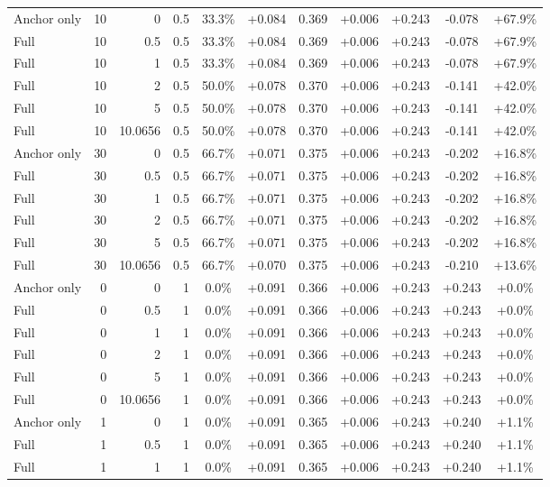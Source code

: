 \begin{table}[htbp]
\begin{tabular}{lrrrccccccc}
Anchor only & 10 & 0 & 0.5 & 33.3\% & +0.084 & 0.369 & +0.006 & +0.243 & -0.078 & +67.9\% \\
Full & 10 & 0.5 & 0.5 & 33.3\% & +0.084 & 0.369 & +0.006 & +0.243 & -0.078 & +67.9\% \\
Full & 10 & 1 & 0.5 & 33.3\% & +0.084 & 0.369 & +0.006 & +0.243 & -0.078 & +67.9\% \\
Full & 10 & 2 & 0.5 & 50.0\% & +0.078 & 0.370 & +0.006 & +0.243 & -0.141 & +42.0\% \\
Full & 10 & 5 & 0.5 & 50.0\% & +0.078 & 0.370 & +0.006 & +0.243 & -0.141 & +42.0\% \\
Full & 10 & 10.0656 & 0.5 & 50.0\% & +0.078 & 0.370 & +0.006 & +0.243 & -0.141 & +42.0\% \\
Anchor only & 30 & 0 & 0.5 & 66.7\% & +0.071 & 0.375 & +0.006 & +0.243 & -0.202 & +16.8\% \\
Full & 30 & 0.5 & 0.5 & 66.7\% & +0.071 & 0.375 & +0.006 & +0.243 & -0.202 & +16.8\% \\
Full & 30 & 1 & 0.5 & 66.7\% & +0.071 & 0.375 & +0.006 & +0.243 & -0.202 & +16.8\% \\
Full & 30 & 2 & 0.5 & 66.7\% & +0.071 & 0.375 & +0.006 & +0.243 & -0.202 & +16.8\% \\
Full & 30 & 5 & 0.5 & 66.7\% & +0.071 & 0.375 & +0.006 & +0.243 & -0.202 & +16.8\% \\
Full & 30 & 10.0656 & 0.5 & 66.7\% & +0.070 & 0.375 & +0.006 & +0.243 & -0.210 & +13.6\% \\
Anchor only & 0 & 0 & 1 & 0.0\% & +0.091 & 0.366 & +0.006 & +0.243 & +0.243 & +0.0\% \\
Full & 0 & 0.5 & 1 & 0.0\% & +0.091 & 0.366 & +0.006 & +0.243 & +0.243 & +0.0\% \\
Full & 0 & 1 & 1 & 0.0\% & +0.091 & 0.366 & +0.006 & +0.243 & +0.243 & +0.0\% \\
Full & 0 & 2 & 1 & 0.0\% & +0.091 & 0.366 & +0.006 & +0.243 & +0.243 & +0.0\% \\
Full & 0 & 5 & 1 & 0.0\% & +0.091 & 0.366 & +0.006 & +0.243 & +0.243 & +0.0\% \\
Full & 0 & 10.0656 & 1 & 0.0\% & +0.091 & 0.366 & +0.006 & +0.243 & +0.243 & +0.0\% \\
Anchor only & 1 & 0 & 1 & 0.0\% & +0.091 & 0.365 & +0.006 & +0.243 & +0.240 & +1.1\% \\
Full & 1 & 0.5 & 1 & 0.0\% & +0.091 & 0.365 & +0.006 & +0.243 & +0.240 & +1.1\% \\
Full & 1 & 1 & 1 & 0.0\% & +0.091 & 0.365 & +0.006 & +0.243 & +0.240 & +1.1\% \\

\end{tabular}
\end{table}
